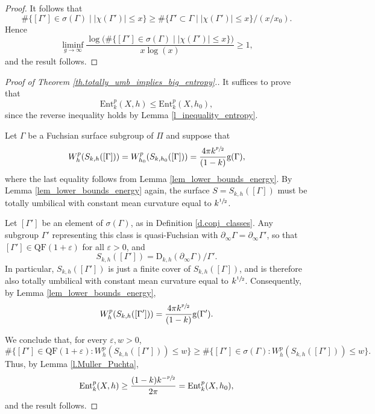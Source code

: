 \documentclass[11pt]{article}
\theoremstyle{plain}
\theoremstyle{definition}
\let\eps\varepsilon
\newcommand{\Ent}{\mathrm{Ent}}
\newcommand{\QF}{\mathrm{QF}}
\newcommand{\bord}{\partial_{\infty}}
\begin{document}
\begin{proof}
It follows that
\begin{equation*}
\#\{[\Gamma']\in\sigma(\Gamma)\mid \left|\chi(\Gamma')\right| \leq x\}
\geq \#\{\Gamma'\subset\Gamma\mid \left|\chi(\Gamma')\right| \leq x\}/(x/x_0).
\end{equation*}
Hence
\begin{equation*}
\liminf_{g\to\infty}\frac{\log\bigl(\#\{[\Gamma']\in\sigma(\Gamma)\mid \left|\chi(\Gamma')\right|\leq x\}\bigr)}{x\log(x)} \geq 1,
\end{equation*}
and the result follows.
\end{proof}

\begin{proof}[Proof of Theorem \ref{th.totally_umb_implies_big_entropy}.] It suffices to prove that
\begin{equation*}
\Ent^{p}_{k}(X,h)\leq\Ent^{p}_{k}(X,h_0),
\end{equation*}
since the reverse inequality holds by Lemma \ref{l_inequality_entropy}.

Let $\Gamma$ be a Fuchsian surface subgroup of $\Pi$ and suppose that
\begin{equation*}
W^{p}_{h}(S_{k,h}([\Gamma]))=W^{p}_{h_0}(S_{k,h_0}([\Gamma]))=\frac{4\pi k^{\sfrac{p}{2}}}{(1-k)}\mathrm{g}(\Gamma),
\end{equation*}
where the last equality follows from Lemma \ref{lem_lower_bounds_energy}. By Lemma \ref{lem_lower_bounds_energy} again, the surface $S=S_{k,h}([\Gamma])$ must be totally umbilical with constant mean curvature equal to $k^{\sfrac{1}{2}}$.

Let $[\Gamma']$ be an element of $\sigma(\Gamma)$, as in Definition \ref{d.conj_classes}. Any subgroup $\Gamma'$ representing this class is quasi-Fuchsian with $\bord \Gamma=\bord \Gamma'$, so that $[\Gamma']\in\QF(1+\eps)$ for all $\eps>0$, and
\begin{equation*}
S_{k,h}([\Gamma'])=\mathrm{D}_{k,h}(\bord \Gamma)/\Gamma'.
\end{equation*}
In particular, $S_{k,h}([\Gamma'])$ is just a finite cover of $S_{k,h}([\Gamma])$, and is therefore also totally umbilical with constant mean curvature equal to $k^{\sfrac{1}{2}}$. Consequently, by Lemma \ref{lem_lower_bounds_energy},
\begin{equation*}
W^{p}_{h}(S_{k,h}([\Gamma']))=\frac{4\pi k^{\sfrac{p}{2}}}{(1-k)}\mathrm{g}(\Gamma').
\end{equation*}

We conclude that, for every $\eps,w>0$,
\begin{equation*}
\#\{[\Gamma']\in\QF(1+\eps):W^{p}_{h}(S_{k,h}([\Gamma']))\leq w\}\geq \#\{[\Gamma']\in\sigma(\Gamma):W^{p}_{h}(S_{k,h}([\Gamma']))\leq w\}.
\end{equation*}
Thus, by Lemma \ref{l.Muller_Puchta},
\begin{equation*}
\Ent^{p}_{k}(X,h)\geq\frac{(1-k)k^{-\sfrac{p}{2}}}{2\pi}=\Ent^{p}_{k}(X,h_0),
\end{equation*}
and the result follows.
\end{proof}
\end{document}
